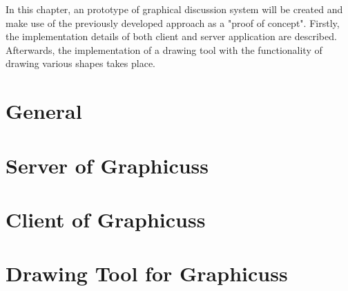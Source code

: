 In this chapter, an prototype of graphical discussion system will be created and make use of the previously developed approach as a "proof of concept". Firstly, the implementation details of both client and server application are described. Afterwards, the implementation of a drawing tool with the functionality of drawing various shapes takes place.


\section{General}


\section{Server of Graphicuss}


\section{Client of Graphicuss}


\section{Drawing Tool for Graphicuss}\label{sec:drawing-imp}


% 

